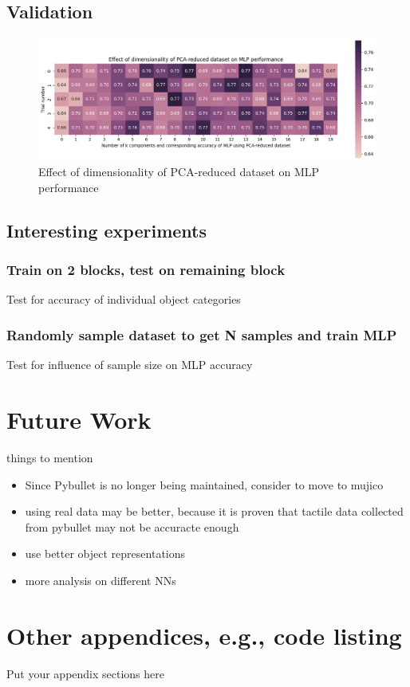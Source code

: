 \documentclass[11pt, a4paper]{report}
\theoremstyle{definition}
\begin{document}
\section{Validation}
\begin{figure}[H]
    \centering
    \includegraphics[scale=0.55]{docs/Project Report/Media/mlp_pca_accuracy_analysis.png}
    \caption{Effect of dimensionality of PCA-reduced dataset on MLP performance}
    \label{fig:my_label}
\end{figure}


\section{Interesting experiments}
\subsection{Train on 2 blocks, test on remaining block}
Test for accuracy of individual object categories


\subsection{Randomly sample dataset to get N samples and train MLP}
Test for influence of sample size on MLP accuracy


\chapter{Future Work}
\label{chap:6}
things to mention
\begin{itemize}
    \item Since Pybullet is no longer being maintained, consider to move to mujico
    \item using real data may be better, because it is proven that tactile data collected from pybullet may not be accuracte enough
    \item use better object representations
    \item more analysis on different NNs
\end{itemize}




\appendix
\printbibliography

\chapter{Other appendices, e.g., code listing}
Put your appendix sections here
\end{document}
